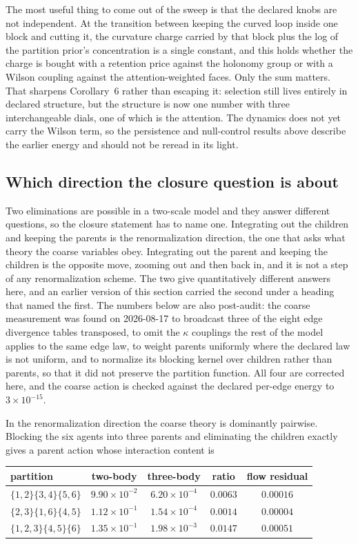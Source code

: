 \documentclass[11pt,letterpaper]{article}
\begin{document}
The most useful thing to come out of the sweep is that the declared knobs are not
independent. At the transition between keeping the curved loop inside one block and
cutting it, the curvature charge carried by that block plus the log of the partition
prior's concentration is a single constant, and this holds whether the charge is
bought with a retention price against the holonomy group or with a Wilson coupling
against the attention-weighted faces. Only the sum matters. That sharpens
Corollary~6 rather than escaping it: selection still lives entirely in declared
structure, but the structure is now one number with three interchangeable dials, one
of which is the attention. The dynamics does not yet carry the Wilson term, so the
persistence and null-control results above describe the earlier energy and should not
be reread in its light.

\subsection{Which direction the closure question is about}

Two eliminations are possible in a two-scale model and they answer different
questions, so the closure statement has to name one. Integrating out the children
and keeping the parents is the renormalization direction, the one that asks what
theory the coarse variables obey. Integrating out the parent and keeping the
children is the opposite move, zooming out and then back in, and it is not a step
of any renormalization scheme. The two give quantitatively different answers here,
and an earlier version of this section carried the second under a heading that
named the first. The numbers below are also post-audit: the coarse measurement was
found on 2026-08-17 to broadcast three of the eight edge divergence tables
transposed, to omit the $\kappa$ couplings the rest of the model applies to the same
edge law, to weight parents uniformly where the declared law is not uniform, and to
normalize its blocking kernel over children rather than parents, so that it did not
preserve the partition function. All four are corrected here, and the coarse action
is checked against the declared per-edge energy to $3\times10^{-15}$.

In the renormalization direction the coarse theory is dominantly pairwise. Blocking
the six agents into three parents and eliminating the children exactly gives a
parent action whose interaction content is

\begin{center}
\small
\begin{tabular}{@{}lcccc@{}}
\toprule
partition & two-body & three-body & ratio & flow residual \\
\midrule
$\{1,2\}\{3,4\}\{5,6\}$ & $9.90\times10^{-2}$ & $6.20\times10^{-4}$ & $0.0063$ & $0.00016$ \\
$\{2,3\}\{1,6\}\{4,5\}$ & $1.12\times10^{-1}$ & $1.54\times10^{-4}$ & $0.0014$ & $0.00004$ \\
$\{1,2,3\}\{4,5\}\{6\}$ & $1.35\times10^{-1}$ & $1.98\times10^{-3}$ & $0.0147$ & $0.00051$ \\
\bottomrule
\end{tabular}
\end{center}
\end{document}
